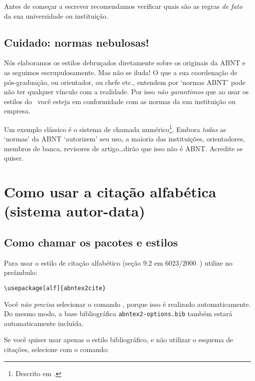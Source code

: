 \documentclass[a4paper]{ltxdoc}
\begin{document}
Antes de começar a escrever recomendamos verificar quais são as regras \emph{de
fato} da sua universidade ou instituição.

\subsection{Cuidado: normas nebulosas!}

Nós elaboramos os estilos debruçados diretamente sobre os originais da ABNT
e as seguimos escrupulosamente. Mas não se iluda! O que a sua coordenação
de pós-graduação, ou orientador, ou chefe etc., entendem por `normas ABNT'
pode não ter qualquer vínculo com a realidade. Por isso \emph{não garantimos}
que ao usar os estilos do \abnTeX\ você esteja em conformidade com as normas
da sua instituição ou empresa.

Um exemplo clássico é o sistema de chamada numérico\footnote{Descrito em
.}. Embora \emph{todas} as `normas' da ABNT
\cite{NBR10520:1988,NBR6023:2000,NBR6023:2002,NBR6023:2002,NBR10520:2001,NBR10520:2002}
`autorizem' seu uso, a maioria das instituições, orientadores, membros de banca,
revisores de artigo\ldots dirão que isso não é ABNT. Acredite se quiser.

\section{Como usar a citação alfabética (sistema autor-data)}

\subsection{Como chamar os pacotes e estilos}

\DescribeMacro{\usepackage[alf]{abntex2cite}}
Para usar o estilo de citação alfabético (seção 9.2 em
6023/2000~\cite{NBR6023:2000}) utilize no preâmbulo:

\begin{verbatim}
\usepackage[alf]{abntex2cite}
\end{verbatim}

\DescribeMacro{}
Você \emph{não precisa} selecionar o comando \verb++, porque
isso é realizado automaticamente. Do mesmo modo, a base bibliográfica
\verb+abntex2-options.bib+ também estará automaticamente incluída.

Se você quiser usar apenas o estilo bibliográfico, e não utilizar o esquema de
citações, selecione com o comando:
\end{document}
